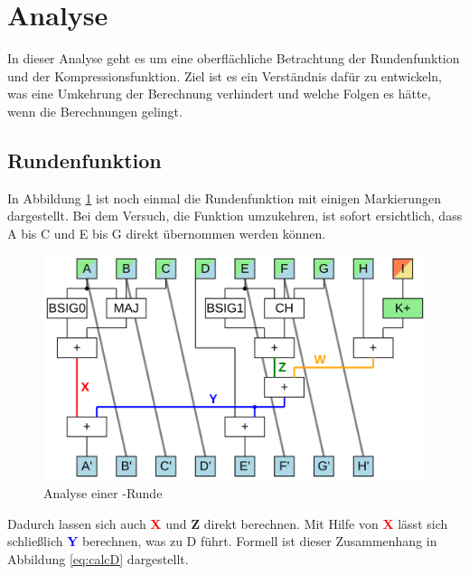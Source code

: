 \section{Analyse}
\label{sec:sha256:analyse}

In dieser Analyse geht es um eine oberflächliche Betrachtung der Rundenfunktion und der Kompressionsfunktion.
Ziel ist es ein Verständnis dafür zu entwickeln, was eine Umkehrung der Berechnung verhindert und welche Folgen es
hätte, wenn die Berechnungen gelingt.

\subsection{Rundenfunktion}
\label{sec:ana:rundenfunktion}
In Abbildung \ref{fig:sha256coreA} ist noch einmal die Rundenfunktion mit einigen Markierungen dargestellt.
Bei dem Versuch, die Funktion umzukehren, ist sofort ersichtlich, dass A bis C und E bis G direkt übernommen werden können.

\begin{figure}[!h]
  \centering
  \includegraphics[scale=0.4]{images/sha256coreA}
  \caption{Analyse einer -Runde}
  \label{fig:sha256coreA}
\end{figure}

Dadurch lassen sich auch \textcolor{red}{\textbf{X}} und \textcolor{Strong Green}{\textbf{Z}} direkt berechnen.
Mit Hilfe von \textcolor{red}{\textbf{X}} lässt sich schließlich \textcolor{blue}{\textbf{Y}} berechnen, was zu D führt.
Formell ist dieser Zusammenhang in Abbildung \ref{eq:calcD} dargestellt.

